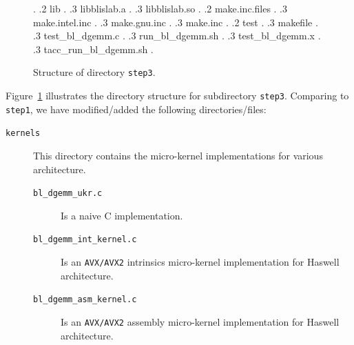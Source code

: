 \begin{figure}[tb!]
\begin{center}
\begin{minipage}{4in}
{.
		.2 lib 
.
        .3 libblislab.a
.
        .3 libblislab.so
.
		.2 make.inc.files
.
		.3 make.intel.inc 
.
		.3 make.gnu.inc 
.
		.3 make.inc 
.
		.2 test 
.
		.3 makefile 
.
		.3 test\_bl\_dgemm.c 
.
		.3 run\_bl\_dgemm.sh 
.
		.3 test\_bl\_dgemm.x 
.       
		.3 tacc\_run\_bl\_dgemm.sh 
.	
	}
\end{minipage}
\end{center}
\caption{Structure of directory {\tt step3}.}
\label{fig:DirStep1}
\end{figure}

Figure~\ref{fig:DirStep1} illustrates the directory
structure for subdirectory {\tt step3}. Comparing to {\tt step1}, we have modified/added the following directories/files:

\begin{description}
\item[{\tt kernels}] This directory contains the micro-kernel implementations for various architecture.
\begin{description}
\item[{\tt bl\_dgemm\_ukr.c}] Is a naive C implementation.
\item[{\tt bl\_dgemm\_int\_kernel.c}] Is an {\tt AVX/AVX2} intrinsics micro-kernel implementation for Haswell architecture.
\item[{\tt bl\_dgemm\_asm\_kernel.c}] Is an {\tt AVX/AVX2} assembly micro-kernel implementation for Haswell architecture.
\end{description}
\end{description}

